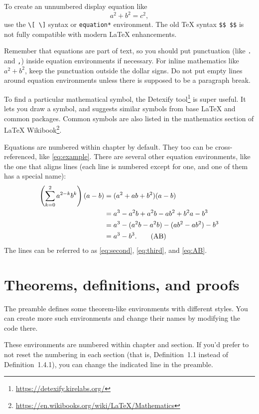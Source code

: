 \documentclass[a4paper, 11pt]{report}
\theoremstyle{plain}
\theoremstyle{definition}
\theoremstyle{remark}
\begin{document}
To create an unnumbered display equation like
\[
a^2 + b^2 = c^2,
\]
use the \verb|\[ \]| syntax or \verb|equation*| environment.
The old \TeX{} syntax \verb|$$ $$| is not fully compatible
with modern \LaTeX{} enhancements.

Remember that equations are part of text,
so you should put punctuation (like \verb|.| and \verb|,|)
inside equation environments if necessary.
For inline mathematics like $a^2 + b^2$, keep the punctuation outside the dollar signs.
Do not put empty lines around equation environments unless
there is supposed to be a paragraph break.

\bigskip

To find a particular mathematical symbol,
the Detexify tool\footnote{\url{https://detexify.kirelabs.org/}} is super useful.
It lets you draw a symbol, and suggests similar symbols from base \LaTeX{} and common packages.
Common symbols are also listed in the mathematics section of
\LaTeX{} Wikibook\footnote{\url{https://en.wikibooks.org/wiki/LaTeX/Mathematics}}.

Equations are numbered within chapter by default.
They too can be cross-referenced, like \eqref{eq:example}.
There are several other equation environments, like the one that aligns lines
(each line is numbered except for one, and one of them has a special name):
\begin{align}
\left( \sum_{k=0}^2 a^{2-k} b^k \right) (a-b)
&= (a^2 + ab + b^2) (a - b) \label{eq:second}\\
&= a^3 - a^2 b + a^2 b - ab^2 + b^2 a - b^3 \label{eq:third}\\
&= a^3 - (a^2 b - a^2 b) - (ab^2 - a b^2) - b^3 \notag\\
&= a^3 - b^3. \tag{AB}\label{eq:AB}
\end{align}
The lines can be referred to as \eqref{eq:second}, \eqref{eq:third}, and \eqref{eq:AB}.


\section{Theorems, definitions, and proofs}

The preamble defines some theorem-like environments with different styles.
You can create more such environments and change their names by modifying the code there.

These environments are numbered within chapter and section.
If you'd prefer to not reset the numbering in each section
(that is, Definition~1.1 instead of Definition~1.4.1),
you can change the indicated line in the preamble.
\end{document}
